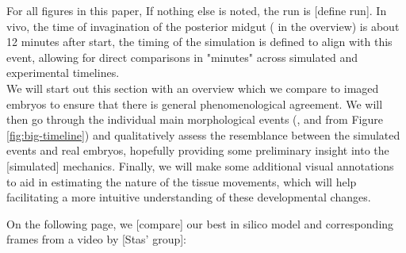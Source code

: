 For all figures in this paper, If nothing else is noted, the run is [define run]. In vivo, the time of invagination of the posterior midgut ( in the overview) is about 12 minutes after start, the timing of the simulation is defined to align with this event, allowing for direct comparisons in "minutes" across simulated and experimental timelines.\\


We will start out this section with an overview which we compare to imaged embryos to ensure that there is general phenomenological agreement. We will then go through the individual main morphological events (,  and  from Figure \ref{fig:big-timeline}) and qualitatively assess the resemblance between the simulated events and real embryos, hopefully providing some preliminary insight into the [simulated] mechanics. Finally, we will make some additional visual annotations to aid in estimating the nature of the tissue movements, which will help facilitating a more intuitive understanding of these developmental changes.

On the following page, we [compare] our best in silico model and corresponding frames from a video by [Stas' group]: 
\newpage

